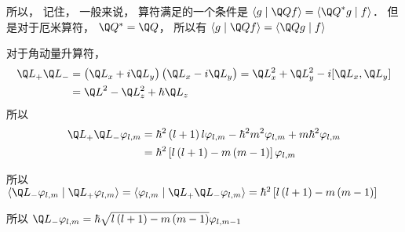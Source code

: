 
所以， 记住， 一般来说， 算符满足的一个条件是 $\left\langle {g}
 \mathrel{\left | {\vphantom {g {\Q Qf}}}
 \right. \kern-\nulldelimiterspace}
 {\Q Qf} \right\rangle  = \left\langle {{{\Q Q}^ * }g}
 \mathrel{\left | {\vphantom {{{{\Q Q}^ * }g} f}}
 \right. \kern-\nulldelimiterspace}
 {f} \right\rangle $．   但是对于厄米算符， ${\Q Q^ * } = \Q Q$，   所以有 $\left\langle {g}
 \mathrel{\left | {\vphantom {g {\Q Qf}}}
 \right. \kern-\nulldelimiterspace}
 {\Q Qf} \right\rangle  = \left\langle {\Q Qg}
 \mathrel{\left | {\vphantom {{\Q Qg} f}}
 \right. \kern-\nulldelimiterspace}
 {f} \right\rangle $  

对于角动量升算符， 
 \begin{equation}
\begin{aligned}
  {{\Q L}_ + }{{\Q L}_ - } &= \left( {{{\Q L}_x} + i{{\Q L}_y}} \right)\left( {{{\Q L}_x} - i{{\Q L}_y}} \right) = \Q L_x^2 + \Q L_y^2 - i[{{\Q L}_x},{{\Q L}_y}] \hfill \\
   &= {{\Q L}^2} - \Q L_z^2 + \hbar {{\Q L}_z} \hfill \\ 
\end{aligned} 
\end{equation}
所以
 \begin{equation}
\begin{aligned}
  {{\Q L}_ + }{{\Q L}_ - }{\varphi_{l,m}}&= {\hbar ^2}\left( {l + 1} \right)l{\varphi_{l,m}} - {\hbar ^2}{m^2}{\varphi_{l,m}} + m{\hbar ^2}{\varphi_{l,m}} \hfill \\
  & = {\hbar ^2}\left[ {l\left( {l + 1} \right) - m\left( {m - 1} \right)} \right]{\varphi_{l,m}} \hfill \\ 
\end{aligned} 
\end{equation}

所以  $\left\langle {{{\Q L}_ - }{\varphi_{l,m}}}
 \mathrel{\left | {\vphantom {{{{\Q L}_ - }{\varphi_{l,m}}} {{{\Q L}_ + }{\varphi_{l,m}}}}}
 \right. \kern-\nulldelimiterspace}
 {{{\Q L}_ + }{\varphi_{l,m}}} \right\rangle  = \left\langle {\varphi_{l,m}}
 \mathrel{\left | {\vphantom {{\varphi_{l,m}} {{{\Q L}_ + }{{\Q L}_ - }{\varphi_{l,m}}}}}
 \right. \kern-\nulldelimiterspace}
 {{{\Q L}_ + }{{\Q L}_ - }{\varphi_{l,m}}} \right\rangle  = {\hbar ^2}\left[ {l\left( {l + 1} \right) - m\left( {m - 1} \right)} \right]$  
 
所以 ${\Q L_ - }{\varphi_{l,m}} = \hbar \sqrt {l\left( {l + 1} \right) - m\left( {m - 1} \right)} {\varphi_{l,m - 1}}$ 

